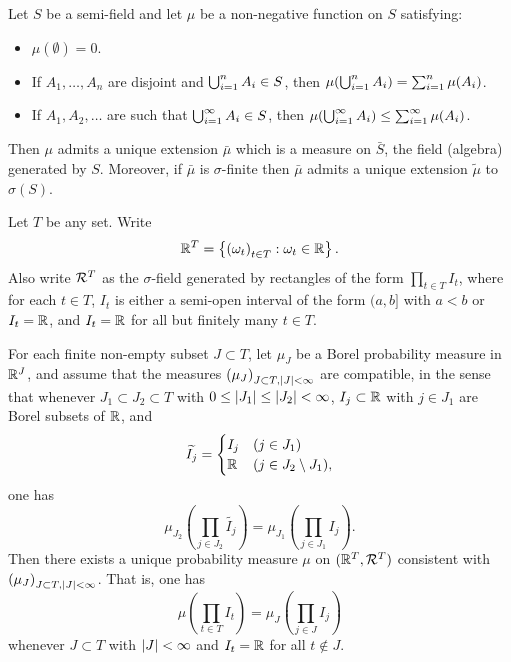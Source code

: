 \documentclass[a4paper]{article}
\begin{document}
\begin{thm}
  Let $S$ be a semi-field and let $\mu$ be a non-negative function on $S$
  satisfying:
  \begin{itemize}
    \item $\mu (\emptyset) = 0$.
    \item If $A_1, \dots, A_n$ are disjoint and $\bigcup_{i=1}^n A_i \in S$, then
          $\mu (\bigcup_{i=1}^n A_i) = \sum_{i=1}^n \mu (A_i)$.
    \item If $A_1, A_2, \dots$ are such that $\bigcup_{i=1}^\infty A_i \in S$, then
          $\mu (\bigcup_{i=1}^\infty A_i) \leq \sum_{i=1}^\infty \mu (A_i)$.
  \end{itemize}
  Then $\mu$ admits a unique extension $\bar{\mu}$ which is a
  measure on $\bar{S}$, the field (algebra) generated by $S$. Moreover,
  if $\bar{\mu}$ is $\sigma$-finite then $\bar{\mu}$ admits a unique
  extension $\tilde{\mu}$ to $\sigma (S)$.
\end{thm}

\begin{notation}
  Let $T$ be any set. Write
  \[
    \mathbb{R}^T = \left\{ \left( \omega_t \right)_{t \in T} :
    \omega_t \in \mathbb{R} \right\}.
  \]
  Also write $\mathcal{R}^T$ as the $\sigma$-field generated by rectangles
  of the form $\prod_{t \in T} I_t$, where for each $t \in T$,
  $I_t$ is either a semi-open interval of the form $(a, b]$
  with $a < b$ or $I_t = \mathbb{R}$, and $I_t = \mathbb{R}$ for all but finitely
  many $t \in T$.
\end{notation}

\begin{thm}
  For each finite non-empty subset $J \subset T$,
  let $\mu_J$ be a Borel probability measure in $\mathbb{R}^J$,
  and assume that the measures $\left( \mu_J \right)_{J \subset T,
      \left\lvert J\right\rvert < \infty}$ are
  compatible, in the sense that whenever $J_1 \subset J_2 \subset T$
  with $0 \leq \left\lvert J_1\right\rvert \leq \left\lvert J_2\right\rvert < \infty$,
  $I_j \subset \mathbb{R}$ with $j \in J_1$ are Borel subsets of $\mathbb{R}$, and
  \[
    \widetilde{I_j} = \begin{cases}
      I_j & (j \in J_1)                \\
      \mathbb{R}  & (j \in J_2 \setminus J_1),
    \end{cases}
  \]
  one has
  \[
    \mu_{J_2} \left( \prod_{j \in J_2} \tilde{I_{j}} \right)
    = \mu_{J_1} \left( \prod_{j \in J_1} I_j \right).
  \]
  Then there exists a unique probability measure $\mu$ on
  $(\mathbb{R}^T, \mathcal{R}^T)$ consistent with $\left( \mu_J \right)_{J \subset T,
      \left\lvert J\right\rvert < \infty}$. That is, one has
  \[
    \mu \left( \prod_{t \in T} I_t \right)
    = \mu_J \left( \prod_{j \in J} I_j \right)
  \]
  whenever $J \subset T$ with $\left\lvert J\right\rvert < \infty$ and $I_t = \mathbb{R}$
  for all $t \notin J$.
\end{thm}
\end{document}

